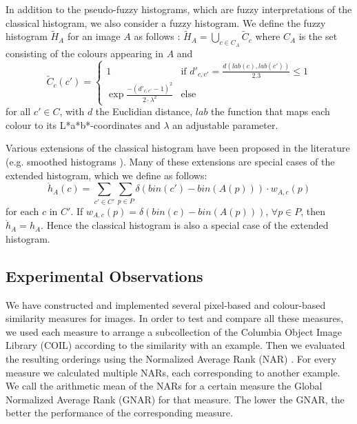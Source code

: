 \documentclass[twocolumn]{phdsymp} %
\begin{document}
In addition to the pseudo-fuzzy histograms, which are fuzzy interpretations of the
classical histogram, we also consider a fuzzy histogram. We define the fuzzy histogram
$\widetilde{H}_A$ for an image $A$ as follows \cite{vertan:fuzzy_histograms}:
$\widetilde{H}_A = \bigcup_{c \in C_A} \widetilde{C}_c$
where $C_A$ is the set consisting of the colours appearing in $A$ and 
\begin{displaymath}
\widetilde{C}_c(c') =
\begin{cases}
1 & \text{if } d'_{c,c'} = \frac{d \left( lab(c), lab(c') \right)}{2.3} \leq 1 \\ 
\exp \frac{- \left( d'_{c,c'} - 1 \right)^2}{2 \cdot \lambda^2} & \text{else}
\end{cases}
\end{displaymath} 
for all $c' \in C$, with $d$ the Euclidian distance, $lab$ the function that maps each 
colour to its L*a*b*-coordinates and $\lambda$ an adjustable parameter.

Various extensions of the classical histogram have been proposed in the literature 
(e.g. smoothed histograms \cite{vertan:fuzzy_histograms}).
Many of these extensions are special cases of the extended histogram, which we define
as follows:
\begin{displaymath}
\mathring{h}_A(c) = \sum_{c' \in C'} \sum_{p \in P} \delta (bin(c')-bin(A(p))) \cdot w_{A,c}(p)
\end{displaymath}
for each $c$ in $C'$. If 
$w_{A,c}(p)=\delta(bin(c)-bin(A(p)))$, $\forall p \in P$, then $\mathring{h}_A=h_A$.
Hence the classical histogram is also a special case of the extended 
histogram.

\subsection{Experimental Observations}

We have constructed and implemented several pixel-based and colour-based similarity measures 
for images. In order to test and compare all these measures, we used each measure to 
arrange a subcollection of the Columbia Object Image Library (COIL) \cite{coil-100} 
according to the similarity with an example. Then we
evaluated the resulting orderings using the Normalized Average Rank (NAR) \cite{muller:perf_eval}.
For every measure we calculated multiple NARs, each corresponding to another example.
We call the arithmetic mean of the NARs for a certain measure the Global Normalized 
Average Rank (GNAR) for that measure. The lower the GNAR, the better the performance
of the corresponding measure.
\end{document}
